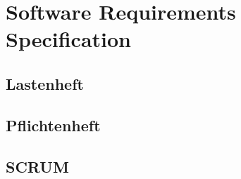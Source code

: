 \chapter{Software Requirements Specification}

\lipsum[3-5]

\section{Lastenheft}

\lipsum[3-5]

\section{Pflichtenheft}

\lipsum[3-5]

\section{SCRUM}

\lipsum[3-5]
